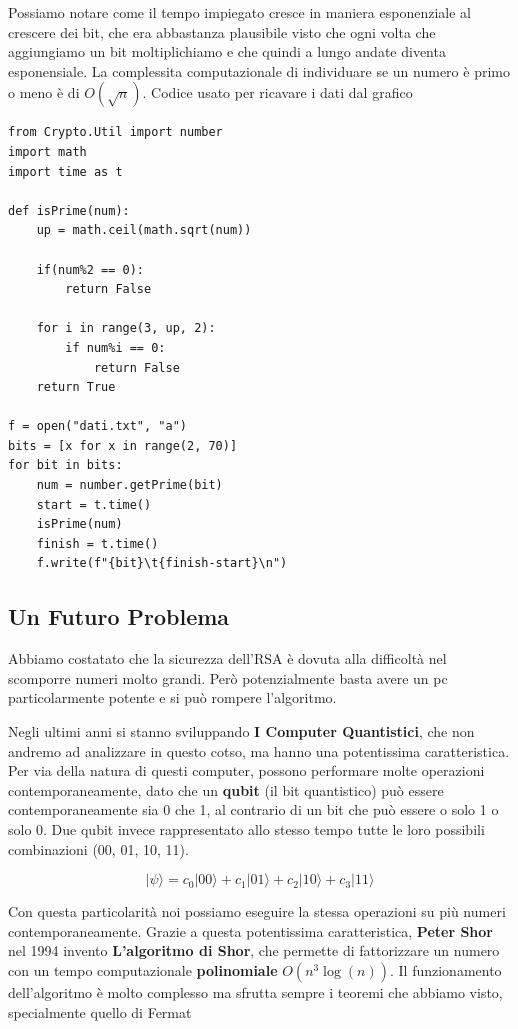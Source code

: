 \documentclass{rapport}
\begin{document}
Possiamo notare come il tempo impiegato cresce in maniera esponenziale al crescere dei bit, che era abbastanza plausibile visto che ogni volta che aggiungiamo un bit moltiplichiamo e che quindi a lungo andate diventa esponensiale. La complessita computazionale di individuare se un numero è primo o meno è di \textbf{$O(\sqrt{n})$}.
\newpage
Codice usato per ricavare i dati dal grafico
\begin{lstlisting}[language=CustomPython]
from Crypto.Util import number
import math
import time as t

def isPrime(num):  
    up = math.ceil(math.sqrt(num))
    
    if(num%2 == 0):
        return False

    for i in range(3, up, 2):
        if num%i == 0:
            return False
    return True

f = open("dati.txt", "a")
bits = [x for x in range(2, 70)]
for bit in bits:
    num = number.getPrime(bit)
    start = t.time()
    isPrime(num)
    finish = t.time()
    f.write(f"{bit}\t{finish-start}\n")
\end{lstlisting}

\newpage
\subsection{Un Futuro Problema}
Abbiamo costatato che la sicurezza dell'RSA è dovuta alla difficoltà nel scomporre numeri molto grandi. Però potenzialmente basta avere un pc particolarmente potente e si può rompere l'algoritmo. 

Negli ultimi anni si stanno sviluppando \textbf{I Computer Quantistici}, che non andremo ad analizzare in questo cotso, ma hanno una potentissima caratteristica. Per via della natura di questi computer, possono performare molte operazioni contemporaneamente, dato che un \textbf{qubit} (il bit quantistico) può essere contemporaneamente sia 0 che 1, al contrario di un bit che può essere o solo 1 o solo 0. Due qubit invece rappresentato allo stesso tempo tutte le loro possibili combinazioni (00, 01, 10, 11). 

\begin{equation*}
    |\psi\rangle = c_0|00\rangle + c_1|01\rangle + c_2|10\rangle+ c_3|11\rangle
\end{equation*}



Con questa particolarità noi possiamo eseguire la stessa operazioni su più numeri contemporaneamente. Grazie a questa potentissima caratteristica, \textbf{Peter Shor} nel 1994 invento \textbf{L'algoritmo di Shor}, che permette di fattorizzare un numero con un tempo computazionale \textbf{polinomiale} $O(n^3\log(n))$. Il funzionamento dell'algoritmo è molto complesso ma sfrutta sempre i teoremi che abbiamo visto, specialmente quello di Fermat 
\end{document}

